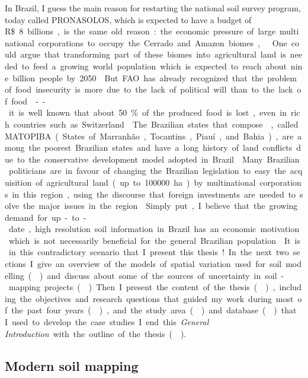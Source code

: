 In Brazil, I guess the main reason for restarting the national soil survey program, today called
PRONASOLOS, which is expected to have a budget of \SI{8}[R\$]~billions, is the same old reason: the
economic pressure of large multinational corporations to occupy the Cerrado and Amazon biomes,
 \cite{Macarini2005,Silva2005}. One could argue that transforming part of
these biomes into agricultural land is needed to feed a growing world population which is expected
to reach about nine billion people by \num{2050} \cite{SanchezEtAl2009}. But FAO has already recognized
that the problem of food insecurity is more due to the lack of political will than to the
lack of food \cite{FAO2005,FAO2009,FAO2015} -- it is well known that about \SI{50}{\percent} of the
produced food is lost, even in rich countries such as Switzerland \cite{BerettaEtAl2013}. The
Brazilian states that compose , called MATOPIBA (States of
Marranhão, Tocantins, Piauí, and Bahia), are among the poorest Brazilian states and have a long
history of land conflicts due to the conservative development model adopted in Brazil
\cite{ComissaoPastoraldaTerra2015}. Many Brazilian politicians are in favour of changing the
Brazilian legislation to easy the acquisition of agricultural land (up to \SI{100000}{\hectare}) by
multinational corporations in this region, using the discourse that foreign investments are needed
to solve the major issues in the region \cite{SECOM2015}. Simply put, I believe that the growing
demand for up-to-date, high resolution soil information in Brazil has an economic motivation which
is not necessarily beneficial for the general Brazilian population
\cite{ComissaoPastoraldaTerra2015,SECOM2015}. It is in this contradictory scenario that I present this
thesis!

In the next two sections I give an overview of the models of spatial variation used for soil
modelling () and discuss about some of the sources of uncertainty in
soil-mapping projects (). Then I present the content of the thesis
(), including the objectives and research questions that guided my work
during most of the past four years (), and the study area
() and database () that I used to develop the case
studies. I end this \textit{General Introduction} with the outline of the thesis ().

\subsection{Modern soil mapping}
\label{sec:intro-soil-mapping}

